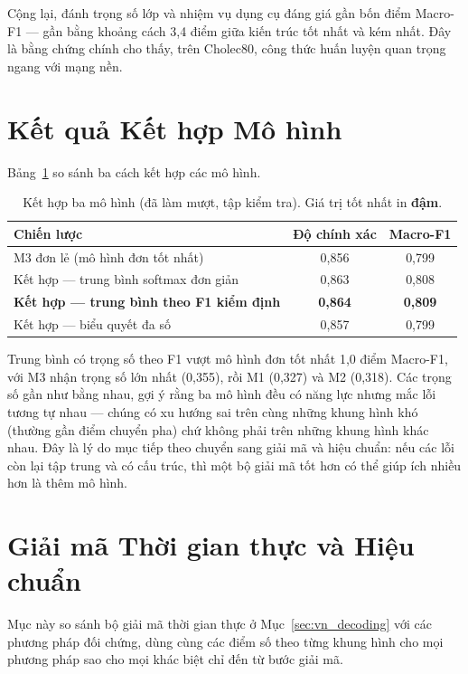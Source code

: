 Cộng lại, đánh trọng số lớp và nhiệm vụ dụng cụ đáng giá gần bốn điểm Macro-F1 --- gần bằng khoảng cách 3,4 điểm giữa kiến trúc tốt nhất và kém nhất. Đây là bằng chứng chính cho thấy, trên Cholec80, công thức huấn luyện quan trọng ngang với mạng nền.

\section{Kết quả Kết hợp Mô hình}

Bảng~\ref{tab:vn_ensemble} so sánh ba cách kết hợp các mô hình.

\begin{table}[H]
\centering
\caption{Kết hợp ba mô hình (đã làm mượt, tập kiểm tra). Giá trị tốt nhất in \textbf{đậm}.}
\label{tab:vn_ensemble}
\begin{tabular}{lcc}
\toprule
\textbf{Chiến lược} & \textbf{Độ chính xác} & \textbf{Macro-F1} \\
\midrule
M3 đơn lẻ (mô hình đơn tốt nhất)        & 0,856 & 0,799 \\
Kết hợp --- trung bình softmax đơn giản & 0,863 & 0,808 \\
\textbf{Kết hợp --- trung bình theo F1 kiểm định} & \textbf{0,864} & \textbf{0,809} \\
Kết hợp --- biểu quyết đa số            & 0,857 & 0,799 \\
\bottomrule
\end{tabular}
\end{table}

Trung bình có trọng số theo F1 vượt mô hình đơn tốt nhất 1,0 điểm Macro-F1, với M3 nhận trọng số lớn nhất (0,355), rồi M1 (0,327) và M2 (0,318). Các trọng số gần như bằng nhau, gợi ý rằng ba mô hình đều có năng lực nhưng mắc lỗi tương tự nhau --- chúng có xu hướng sai trên cùng những khung hình khó (thường gần điểm chuyển pha) chứ không phải trên những khung hình khác nhau. Đây là lý do mục tiếp theo chuyển sang giải mã và hiệu chuẩn: nếu các lỗi còn lại tập trung và có cấu trúc, thì một bộ giải mã tốt hơn có thể giúp ích nhiều hơn là thêm mô hình.

\section{Giải mã Thời gian thực và Hiệu chuẩn}
\label{sec:vn_calibration}

Mục này so sánh bộ giải mã thời gian thực ở Mục~\ref{sec:vn_decoding} với các phương pháp đối chứng, dùng cùng các điểm số theo từng khung hình cho mọi phương pháp sao cho mọi khác biệt chỉ đến từ bước giải mã.

